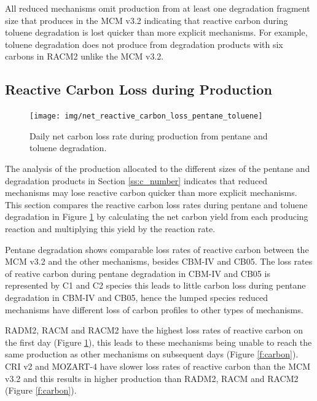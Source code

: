 All reduced mechanisms omit  production from at least one degradation fragment size that produces  in the MCM v3.2 indicating that reactive carbon during toluene degradation is lost quicker than more explicit mechanisms.
For example, toluene degradation does not produce  from degradation products with six carbons in RACM2 unlike the MCM v3.2.

\subsection[Reactive Carbon Loss during Ox Production]{Reactive Carbon Loss during  Production} \label{ss:carbon_loss}

\begin{figure}
    \centering
    \texttt{[image: img/net\_reactive\_carbon\_loss\_pentane\_toluene]}
    \vspace{0mm}
    \caption{Daily net carbon loss rate during  production from pentane and toluene degradation.}
    \vspace{-4mm}
    \label{f:net_carbon_loss}
\end{figure}

The analysis of the  production allocated to the different sizes of the pentane and degradation products in Section \ref{ss:c_number} indicates that reduced mechanisms may lose reactive carbon quicker than more explicit mechanisms.
This section compares the reactive carbon loss rates during pentane and toluene degradation in Figure \ref{f:net_carbon_loss} by calculating the net carbon yield from each  producing reaction and multiplying this yield by the reaction rate.

Pentane degradation shows comparable loss rates of reactive carbon between the MCM v3.2 and the other mechanisms, besides CBM-IV and CB05.
The loss rates of reative carbon during pentane degradation in CBM-IV and CB05 is represented by C1 and C2 species this leads to little carbon loss during pentane degradation in CBM-IV and CB05, hence the lumped species reduced mechanisms have different loss of carbon profiles to other types of mechanisms.

RADM2, RACM and RACM2 have the highest loss rates of reactive carbon on the first day (Figure \ref{f:net_carbon_loss}), this leads to these mechanisms being unable to reach the same  production as other mechanisms on subsequent days (Figure \ref{f:carbon}).
CRI v2 and MOZART-4 have slower loss rates of reactive carbon than the MCM v3.2 and this results in higher  production than RADM2, RACM and RACM2 (Figure \ref{f:carbon}).

